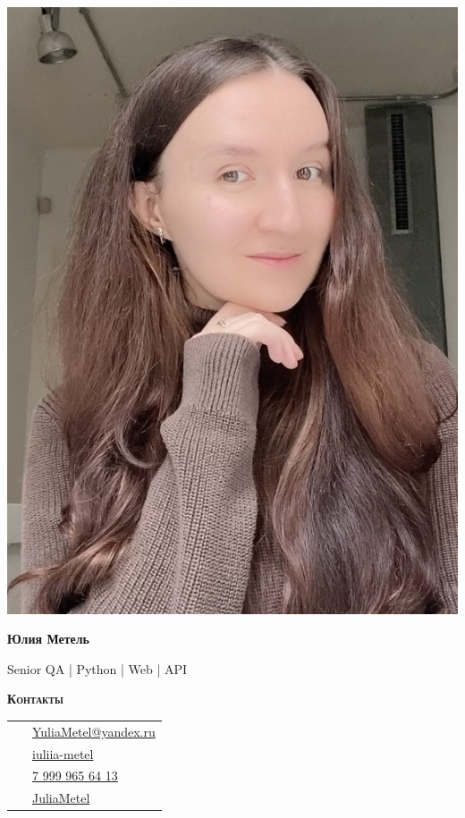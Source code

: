 \documentclass[11pt, a4paper]{article}
\newcommand{\headleft}[1]{\vspace*{2ex}\textsc{\textbf{#1}}\par%
	\vspace*{-1.5ex}\hrulefill\par\vspace*{0.7ex}}
\begin{document}
	
	\setlength{\topskip}{0pt}
	\setlength{\parindent}{0pt}
	\setlength{\parskip}{0pt}
	\setlength{\fboxsep}{0pt}
	\pagestyle{empty}
	\raggedbottom
	
	\begin{minipage}[t]{0.33\textwidth} %
		\colorbox{cvblue!90}{\color{white}  %
			\textwidth\relax%
			\begin{minipage}[t][297mm][t]{0.82\textwidth}
				\raggedright
				\vspace*{2ex} %
				\null\hfill\includegraphics[height=1\textwidth]{avatar.jpeg}\hfill\null

				
				\vspace*{1.5ex}
				
				\Large  \textbf{Юлия Метель} \normalsize 
				
				\vspace*{1.5ex}
				
				Senior QA | Python | Web | API
				
				\headleft{Контакты}
				\vspace*{1ex}
				\begin{tabular}{ @{}c l }
					\Letter\ & \href{mailto:YuliaMetel@yandex.ru?subject=Job Opportunity}{YuliaMetel@yandex.ru} \\
					\faLinkedin\ & \href{https://www.linkedin.com/in/iuliia-metel}{iuliia-metel} \\
					\faMobile*\ & \href{tel:+7 999 965 64 13}{\raisebox{0.2ex}{+}7 999 965 64 13} \\
					\faGithub\ & \href{https://github.com/JuliaMetel}{JuliaMetel} \\
				\end{tabular}
				

\end{minipage}}
\end{minipage}
\end{document}
